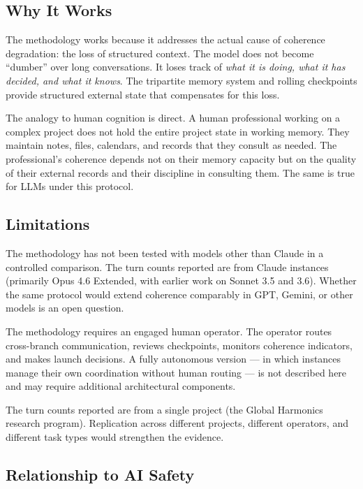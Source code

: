\documentclass[11pt,a4paper]{article}
\begin{document}
\subsection{Why It Works}

The methodology works because it addresses the actual cause of coherence degradation: the loss of structured context. The model does not become ``dumber'' over long conversations. It loses track of \textit{what it is doing, what it has decided, and what it knows}. The tripartite memory system and rolling checkpoints provide structured external state that compensates for this loss.

The analogy to human cognition is direct. A human professional working on a complex project does not hold the entire project state in working memory. They maintain notes, files, calendars, and records that they consult as needed. The professional's coherence depends not on their memory capacity but on the quality of their external records and their discipline in consulting them. The same is true for LLMs under this protocol.

\subsection{Limitations}

The methodology has not been tested with models other than Claude in a controlled comparison. The turn counts reported are from Claude instances (primarily Opus 4.6 Extended, with earlier work on Sonnet 3.5 and 3.6). Whether the same protocol would extend coherence comparably in GPT, Gemini, or other models is an open question.

The methodology requires an engaged human operator. The operator routes cross-branch communication, reviews checkpoints, monitors coherence indicators, and makes launch decisions. A fully autonomous version --- in which instances manage their own coordination without human routing --- is not described here and may require additional architectural components.

The turn counts reported are from a single project (the Global Harmonics research program). Replication across different projects, different operators, and different task types would strengthen the evidence.

\subsection{Relationship to AI Safety}
\end{document}
